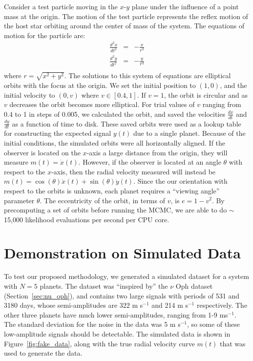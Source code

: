 \documentclass[useAMS,usenatbib]{mn2e}
\begin{document}
Consider a test particle moving in the $x$-$y$ plane under the influence of a
point mass at the origin. The motion of the test particle represents the
reflex motion of the host star orbiting around the center of mass of the
system. The equations of motion for the particle are:
\begin{eqnarray}
\frac{d^2x}{dt^2} &=& -\frac{x}{r^3} \\
\frac{d^2y}{dt^2} &=& -\frac{y}{r^3} \\
\end{eqnarray}
where $r = \sqrt{x^2 + y^2}$. The solutions to this system of equations are elliptical orbits
with the focus at the origin. We set the initial position to $(1, 0)$, and
the initial velocity to $(0, v)$ where $v \in [0.4, 1]$.
If $v=1$, the orbit is circular and as $v$ decreases the orbit becomes more
elliptical. For trial values of $v$ ranging from 0.4 to 1 in steps of 0.005,
we calculated the orbit, and saved the
velocities $\frac{dx}{dt}$ and $\frac{dy}{dt}$ as a function of time to disk.
These saved orbits were used as a lookup table for constructing the expected
signal $y(t)$ due to a single planet.
Because of the initial conditions, the simulated orbits were all horizontally
aligned. If the observer is located on the $x$-axis a large distance
from the origin, they will measure $m(t) = \dot{x}(t)$. However, if the
observer is located at an angle $\theta$ with respect to the $x$-axis, then
the radial velocity measured will instead be
$m(t) = \cos(\theta)\dot{x}(t) + \sin(\theta)\dot{y}(t)$.
Since the our orientation with respect to the orbits is unknown, each planet
requires a ``viewing angle'' parameter $\theta$.
The eccentricity of the orbit, in terms of $v$, is $e = 1 - v^2$.
By precomputing a set of orbits before running the MCMC, we are able to
do $\sim$ 15,000 likelihood evaluations per second per CPU core.

\section{Demonstration on Simulated Data}\label{sec:fake_data}
To test our proposed methodology, we generated a simulated dataset for a
system with $N=5$ planets. The dataset was ``inspired by'' the $\nu$ Oph
dataset (Section~\ref{sec:nu_oph}), and contains two large signals with
periods of 531 and 3180 days, whose semi-amplitudes are
322 m s$^{-1}$ and 214 m s$^{-1}$ respectively. The other three planets have
much lower semi-amplitudes, ranging from 1-9 ms$^{-1}$. The standard deviation
for the noise in the data was 5 m s$^{-1}$, so some of these low-amplitude
signals should be detectable. The simulated data is shown in
Figure~\ref{fig:fake_data}, along with the true radial velocity curve $m(t)$
that was used to generate the data.
\end{document}
